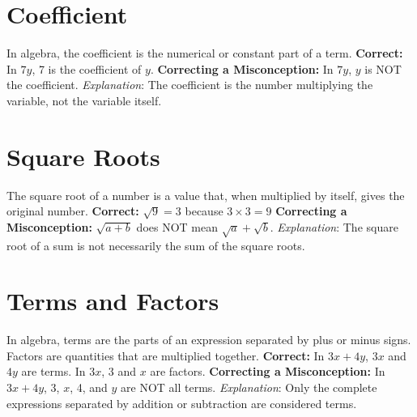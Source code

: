 \documentclass[12pt]{article}
\newenvironment{correct}{\noindent\textbf{Correct:}}{}
\newenvironment{misconception}{\noindent\textbf{Correcting a Misconception:}}{}
\newenvironment{explanation}{\noindent\textit{Explanation}:}{\vspace{1em}}
\begin{document}
\section*{Coefficient}
In algebra, the coefficient is the numerical or constant part of a term.
\begin{correct} In \(7y\), 7 is the coefficient of \(y\). \end{correct}
\begin{misconception} In \(7y\), \(y\) is NOT the coefficient. \end{misconception}
\begin{explanation} The coefficient is the number multiplying the variable, not the variable itself. \end{explanation}

\section*{Square Roots}
The square root of a number is a value that, when multiplied by itself, gives the original number.
\begin{correct} \(\sqrt{9} = 3\) because \(3 \times 3 = 9\) \end{correct}
\begin{misconception} \(\sqrt{a + b}\) does NOT mean \(\sqrt{a} + \sqrt{b}\). \end{misconception}
\begin{explanation} The square root of a sum is not necessarily the sum of the square roots. \end{explanation}

\section*{Terms and Factors}
In algebra, terms are the parts of an expression separated by plus or minus signs. Factors are quantities that are multiplied together.
\begin{correct} In \(3x + 4y\), \(3x\) and \(4y\) are terms. In \(3x\), 3 and \(x\) are factors. \end{correct}
\begin{misconception} In \(3x + 4y\), 3, \(x\), 4, and \(y\) are NOT all terms. \end{misconception}
\begin{explanation} Only the complete expressions separated by addition or subtraction are considered terms. \end{explanation}
\end{document}
